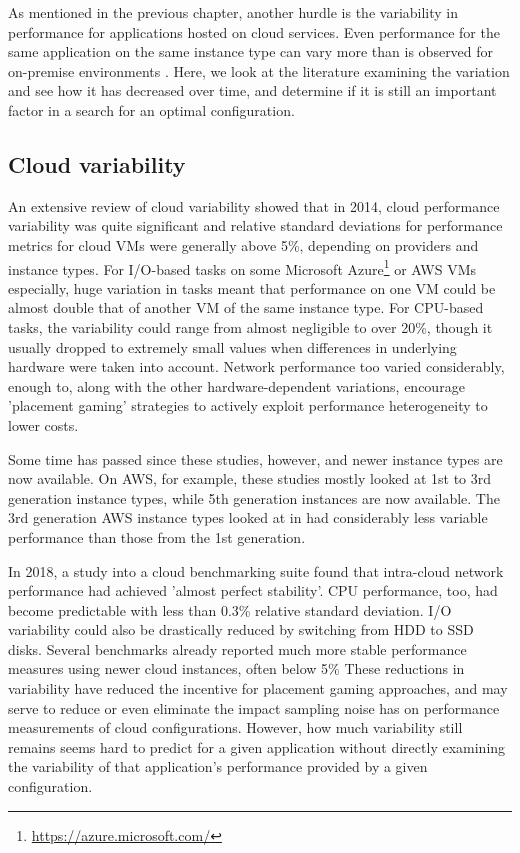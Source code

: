 \documentclass{report}
\begin{document}
As mentioned in the previous chapter, another hurdle is the variability in performance for applications hosted on cloud services. Even performance for the same application on the same instance type can vary more than is observed for on-premise environments \cite{Leitner2014}. Here, we look at the literature examining the variation and see how it has decreased over time, and determine if it is still an important factor in a search for an optimal configuration.

\subsection{Cloud variability}
An extensive review of cloud variability showed that in 2014, cloud performance variability was quite significant and relative standard deviations for performance metrics for cloud VMs were generally above 5\%, depending on providers and instance types\cite{Leitner2014}. For I/O-based tasks on some Microsoft Azure\footnote{\url{https://azure.microsoft.com/}} or AWS VMs especially, huge variation in tasks meant that performance on one VM could be almost double that of another VM of the same instance type. For CPU-based tasks, the variability could range from almost negligible to over 20\%, though it usually dropped to extremely small values when differences in underlying hardware were taken into account. Network performance too varied considerably, enough to, along with the other hardware-dependent variations, encourage 'placement gaming' strategies to actively exploit performance heterogeneity to lower costs\cite{Farley2012}.

Some time has passed since these studies, however, and newer instance types are now available. On AWS, for example, these studies mostly looked at 1st to 3rd generation instance types, while 5th generation instances are now available. The 3rd generation AWS instance types looked at in \cite{Leitner2014} had considerably less variable performance than those from the 1st generation.

In 2018, a study into a cloud benchmarking suite found that intra-cloud network performance had achieved 'almost perfect stability'\cite{Scheuner2018, Scheuner2018a}. CPU performance, too, had become predictable with less than 0.3\% relative standard deviation\cite{Scheuner2018}. I/O variability could also be drastically reduced by switching from HDD to SSD disks. Several benchmarks already reported much more stable performance measures using newer cloud instances, often below 5\%\cite{Davatz2017, Laaber2019} These reductions in variability have reduced the incentive for placement gaming approaches, and may serve to reduce or even eliminate the impact sampling noise has on performance measurements of cloud configurations. However, how much variability still remains seems hard to predict for a given application without directly examining the variability of that application's performance provided by a given configuration.
\end{document}
